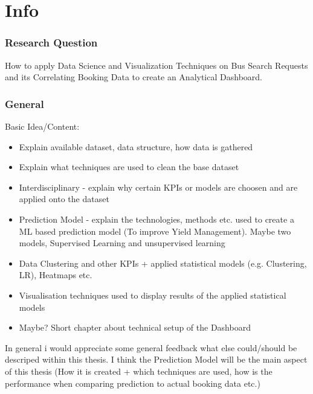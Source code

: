 %
%
% 
% 
% 

\chapter{Info}
\label{chap:info}

\subsection{Research Question}
How to apply Data Science and Visualization Techniques on Bus Search Requests and its Correlating Booking Data to create an Analytical Dashboard.  

\subsection{General}
Basic Idea/Content: \newline

\begin{itemize}
  \item Explain available dataset, data structure, how data is gathered 
  \item Explain what techniques are used to clean the base dataset
  \item Interdisciplinary - explain why certain KPIs or models are choosen and are applied onto the dataset 
  \item Prediction Model - explain the technologies, methods etc. used to create a ML based prediction model (To improve Yield Management). Maybe two models, Supervised Learning and unsupervised learning 
  \item Data Clustering and other KPIs + applied statistical models (e.g. Clustering, LR), Heatmaps etc. 
  \item Visualisation techniques used to display results of the applied statistical models 
  \item Maybe? Short chapter about technical setup of the Dashboard   
\end{itemize}
In general i would appreciate some general feedback what else could/should be descriped within this thesis. I think the Prediction Model will be the main aspect of this thesis (How it is created + which techniques are used, how is the performance when comparing prediction to actual booking data etc.) 




